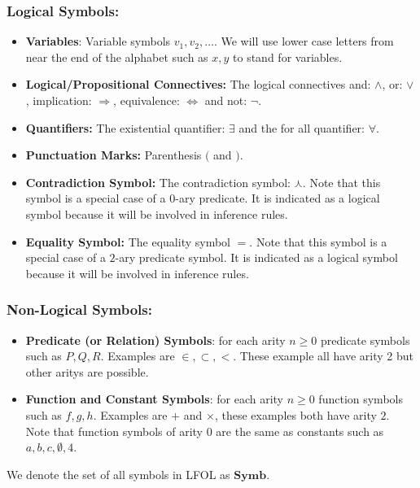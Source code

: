 \documentclass[12pt]{article}
\begin{document}
\subsubsection*{Logical Symbols:}
\begin{itemize}
\item{\textbf{Variables}: Variable symbols $v_1, v_2, \ldots$. We will use lower case letters from near the end of the alphabet such as $x, y$ to stand for variables.}
\item{\textbf{Logical/Propositional Connectives:} The logical connectives and: $\land$, or: $\lor$, implication: $\Rightarrow$, equivalence: $\Leftrightarrow$ and not: $\lnot$.}
\item{\textbf{Quantifiers:} The existential quantifier: $\exists$} and the for all quantifier: $\forall$.
\item{\textbf{Punctuation Marks:} Parenthesis $($ and $)$.}
\item{\textbf{Contradiction Symbol:} The contradiction symbol: $\curlywedge$. Note that this symbol is a special case of a $0$-ary predicate. It is indicated as a logical symbol because it will be involved in inference rules.}
\item{\textbf{Equality Symbol:} The equality symbol $=$. Note that this symbol is a special case of a $2$-ary predicate symbol. It is indicated as a logical symbol because it will be involved in inference rules.}
\end{itemize}

\subsubsection*{Non-Logical Symbols:}
\begin{itemize}
\item{\textbf{Predicate (or Relation) Symbols}: for each arity $n \ge 0$ predicate symbols such as $P, Q, R$. Examples are $\in, \subset, <$. These example all have arity 2 but other aritys are possible.}
\item{\textbf{Function and Constant Symbols}: for each arity $n \ge 0$ function symbols such as $f, g, h$. Examples are $+$ and $\times$, these examples both have arity $2$. Note that function symbols of arity $0$ are the same as constants such as $a,b,c,\emptyset,4$.}
\end{itemize}

We denote the set of all symbols in LFOL as $\mathbf{Symb}$.

\hrulefill
\end{document}
